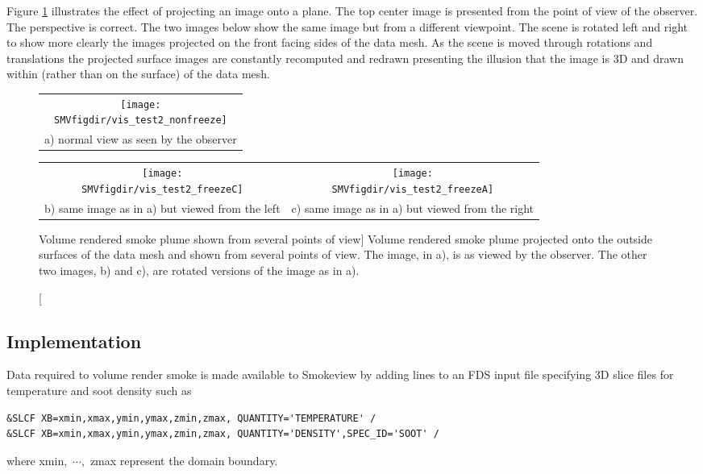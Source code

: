 {Figure \ref{fig:volplume_example} illustrates the effect of
projecting an image onto a plane.  The top center image is
presented from the point of view of the observer.  The perspective
is correct.  The two images below show the same image but from a
different viewpoint.  The scene is rotated left and right to show
more clearly the images projected on the front facing sides of the
data mesh.  As the scene is moved through rotations and
translations the projected surface images are constantly
recomputed and redrawn presenting the illusion that the image is
3D and drawn within (rather than on the surface) of the data mesh.


\begin{figure}[bph]
\begin{center}
\begin{tabular}{c}
\texttt{[image: \\SMVfigdir/vis\_test2\_nonfreeze]}\\
a) normal view as seen by the observer
\end{tabular}
\begin{tabular}{cc}
\texttt{[image: \\SMVfigdir/vis\_test2\_freezeC]}&
\texttt{[image: \\SMVfigdir/vis\_test2\_freezeA]}\\
b) same image as in a) but viewed from the left&c) same image
as in a) but viewed from the right\\
\end{tabular}
\end{center}
\caption
[Volume rendered smoke plume shown from several points of view]
{Volume rendered smoke plume projected onto the outside
surfaces of the data mesh and shown  from several points of view.
The image, in a), is as viewed by the observer.  The other two
images, b) and c), are rotated versions of the image as in a). }
\label{fig:volplume_example}
\end{figure}

\subsection{Implementation}
Data required to volume render smoke is made available to
Smokeview by adding lines to an FDS input file specifying 3D slice
files for temperature and soot density such as
\begin{lstlisting}
&SLCF XB=xmin,xmax,ymin,ymax,zmin,zmax, QUANTITY='TEMPERATURE' /
&SLCF XB=xmin,xmax,ymin,ymax,zmin,zmax, QUANTITY='DENSITY',SPEC_ID='SOOT' /
\end{lstlisting}
where xmin,~$\cdots$,~zmax represent the domain boundary.

}
